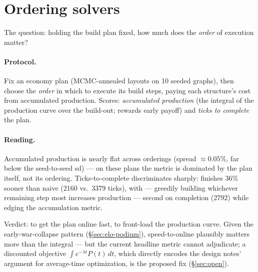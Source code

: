 
\section{Ordering solvers}
\label{sec:ordering}

The question: holding the build plan fixed, how much does the
\emph{order} of execution matter?

\paragraph{Protocol.} Fix an economy plan (MCMC-annealed layouts on 10
seeded graphs), then choose the \emph{order} in which to execute its build
steps, paying each structure's cost from accumulated production. Scores:
\emph{accumulated production} (the integral of the production curve over the
build-out; rewards early payoff) and \emph{ticks to complete} the plan.

\begin{table}[htbp]
\centering
{}
\caption{Ordering solver ranking, MCMC economy plans, 10 seeds.}
\label{tab:ordering}
\end{table}

\paragraph{Reading.} Accumulated production is nearly flat across orderings
(spread $\approx 0.05\%$, far below the seed-to-seed sd) --- on these plans
the metric is dominated by the plan itself, not its ordering.
Ticks-to-complete discriminates sharply:  finishes
36\% sooner than naive  (2160 vs.\ 3379 ticks), with
 --- greedily building whichever remaining step
most increases production --- second on completion (2792) while edging the
accumulation metric.

Verdict:  to get the plan online fast,
 to front-load the production curve. Given the
early-war-collapse pattern (\S\ref{sec:elo-podium}), speed-to-online
plausibly matters more than the integral --- but the current headline metric
cannot adjudicate; a discounted objective $\int e^{-\lambda t} P(t)\,dt$,
which directly encodes the design notes' argument for average-time
optimization, is the proposed fix (\S\ref{sec:open}).
